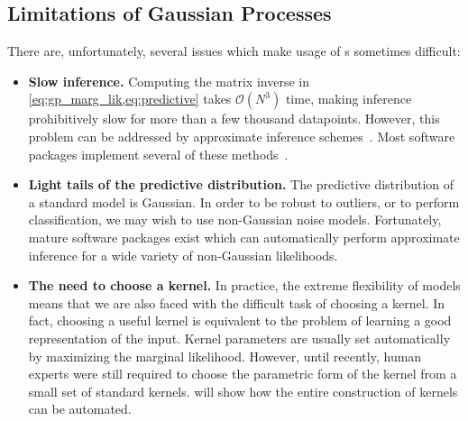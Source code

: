 \subsection{Limitations of Gaussian Processes}

There are, unfortunately, several issues which make usage of \gp{}s sometimes difficult:

\begin{itemize}

\item {\bf Slow inference.}
Computing the matrix inverse in \cref{eq:gp_marg_lik,eq:predictive} takes $\mathcal{O}(N^3)$ time, making inference prohibitively slow for more than a few thousand datapoints.
However, this problem can be addressed by approximate inference schemes~\citep{snelson2006sparse, quinonero2005unifying, hensman2013gaussian}. 
Most \gp{} software packages implement several of these methods~\citep{GPy, GPML, VanRiiHarJylVeh14}.

\item {\bf Light tails of the predictive distribution.}
The predictive distribution of a standard \gp{} model is Gaussian.
In order to be robust to outliers, or to perform classification, we may wish to use non-Gaussian noise models.
Fortunately, mature software packages exist which can automatically perform approximate inference for a wide variety of non-Gaussian likelihoods.

\item {\bf The need to choose a kernel.}
In practice, the extreme flexibility of \gp{} models means that we are also faced with the difficult task of choosing a kernel.
In fact, 
choosing a useful kernel is equivalent to the problem of learning a good representation of the input.
Kernel parameters are usually set automatically by maximizing the marginal likelihood.
However, until recently, human experts were still required to choose the parametric form of the kernel from a small set of standard kernels.
 will show how the entire construction of kernels can be automated.
\end{itemize}





